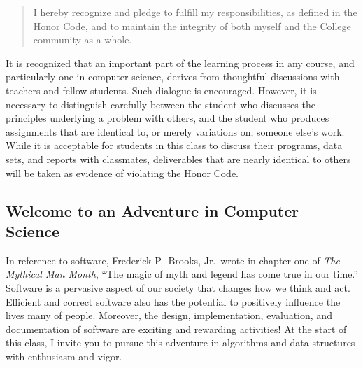 \vspace*{-.1in}
\begin{quote}
I hereby recognize and pledge to fulfill my responsibilities, as defined in the Honor Code, and to maintain the
integrity of both myself and the College community as a whole.  
\end{quote}
\vspace*{-.15in}

\noindent It is recognized that an important part of the learning process in any course, and particularly one in
computer science, derives from thoughtful discussions with teachers and fellow students.  Such dialogue is encouraged.
However, it is necessary to distinguish carefully between the student who discusses the principles underlying a problem
with others, and the student who produces assignments that are identical to, or merely variations on, someone else's
work.  While it is acceptable for students in this class to discuss their programs, data sets, and reports with
classmates, deliverables that are nearly identical to others will be taken as evidence of violating the Honor Code.

\subsection*{Welcome to an Adventure in Computer Science}

In reference to software, Frederick P.\ Brooks, Jr.\ wrote in chapter one of {\em The Mythical Man Month}, ``The magic
of myth and legend has come true in our time.'' Software is a pervasive aspect of our society that changes how we think
and act.  Efficient and correct software also has the potential to positively influence the lives many of people.
Moreover, the design, implementation, evaluation, and documentation of software are exciting and rewarding activities!
At the start of this class, I invite you to pursue this adventure in algorithms and data structures with enthusiasm and
vigor.


